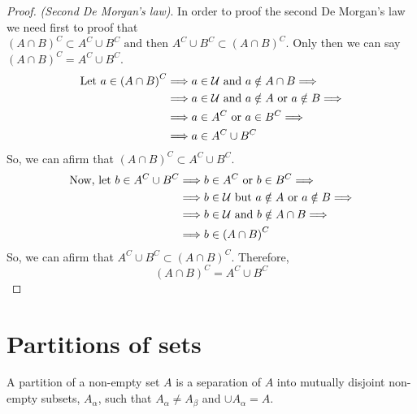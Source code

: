 \begin{proof}
    \textit{(Second De Morgan's law)}. In order to proof the second De Morgan's law we need first to proof that $\left( A\cap B \right)^C\subset A^C\cup B^C \textrm{ and then } A^C\cup B^C \subset \left(  A\cap B\right)^C$. Only then we can say $\left( A\cap B \right)^C = A^C\cup B^C $.
    \begin{align}
        \textrm{Let } a\in\left( A\cap B \right)^C &\Longrightarrow a\in\mathcal{U}\textrm{ and } a\notin A\cap B \Longrightarrow \\
                                     &\Longrightarrow a\in\mathcal{U}\textrm{ and } a\notin A\textrm{ or } a\notin B \Longrightarrow \\ &\Longrightarrow a\in A^C\textrm{ or } a\in B^C \Longrightarrow \\
                                                         &\Longrightarrow a\in A^C\cup B^C
    \end{align}
    So, we can afirm that $\left( A\cap B \right)^C \subset A^C\cup B^C $.
    \begin{align}
        \textrm{Now, let } b\in A^C\cup B^C &\Longrightarrow b\in A^C\textrm{ or } b\in B^C \Longrightarrow \\
                                            &\Longrightarrow b\in\mathcal{U}\textrm{ but } a\notin A\textrm{ or } a\notin B \Longrightarrow \\ &\Longrightarrow b\in\mathcal{U}\textrm{ and } b\notin A\cap B \Longrightarrow \\
                                            &\Longrightarrow b\in \left( A\cap B \right)^C
    \end{align}
    So, we can afirm that $A^C\cup B^C\subset\left( A\cap B \right)^C $. Therefore,
    \begin{equation}
        \left( A\cap B \right)^C = A^C\cup B^C
    \end{equation}

\end{proof}

\section{Partitions of sets}
\begin{defi}[Partition]
    A partition of a non-empty set $A$ is a separation of $A$ into mutually disjoint non-empty subsets, $A_{\alpha}$, such that $A_{\alpha}\neq A_{\beta}$ and $\cup A_{\alpha} = A$.
\end{defi}


